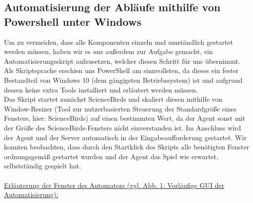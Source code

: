 \subsection{Automatisierung der Abläufe mithilfe von Powershell unter Windows}
Um zu vermeiden, dass alle Komponenten einzeln und umständlich gestartet werden müssen, haben wir es uns außerdem zur Aufgabe gemacht, ein Automatisierungsskript aufzusetzen, welcher diesen Schritt für uns übernimmt. Als Skriptsprache erschien uns PowerShell am sinnvollsten, da dieses ein fester Bestandteil von Windows 10 (dem gängigsten Betriebssystem) ist und aufgrund dessen keine extra Tools installiert und erläutert werden müssen. \\Das Skript startet zunächst ScienceBirds und skaliert diesen mithilfe von Window-Resizer (Tool zur nutzerbasierten Steuerung der Standardgröße eines Fensters, hier: ScienceBirds) auf einen bestimmten Wert, da der Agent sonst mit der Größe des ScienceBirds-Fensters nicht einverstanden ist. Im Anschluss wird der Agent und der Server automatisch in der Eingabeaufforderung gestartet. Wir konnten beobachten, dass durch den Startklick des Skripts alle benötigten Fenster ordnungsgemäß gestartet wurden und der Agent das Spiel wie erwartet, selbstständig gespielt hat.\\ \\
\underline{Erläuterung der Fenster des Automators (vgl. Abb. 1: Vorläufige GUI der Automatisierung):}
